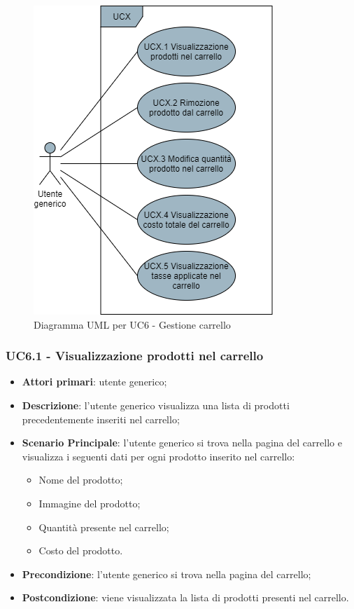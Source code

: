 \begin{figure}[H]
\centering
\includegraphics[scale=0.6]{res/UseCase/Immagini/GestioneCarrello}
\caption{Diagramma UML per UC6 - Gestione carrello}
\end{figure}

\subsubsection{UC6.1 - Visualizzazione prodotti nel carrello}
\begin{itemize}
\item \textbf{Attori primari}: utente generico;
\item \textbf{Descrizione}: l'utente generico visualizza una lista di prodotti precedentemente inseriti nel carrello;
\item \textbf{Scenario Principale}: l'utente generico si trova nella pagina del carrello e visualizza i seguenti dati per ogni prodotto inserito nel carrello:
\begin{itemize}
\item Nome del prodotto;
\item Immagine del prodotto;
\item Quantità presente nel carrello;
\item Costo del prodotto.
\end{itemize}
\item \textbf{Precondizione}: l'utente generico si trova nella pagina del carrello;
\item \textbf{Postcondizione}: viene visualizzata la lista di prodotti presenti nel carrello.
\end{itemize}

